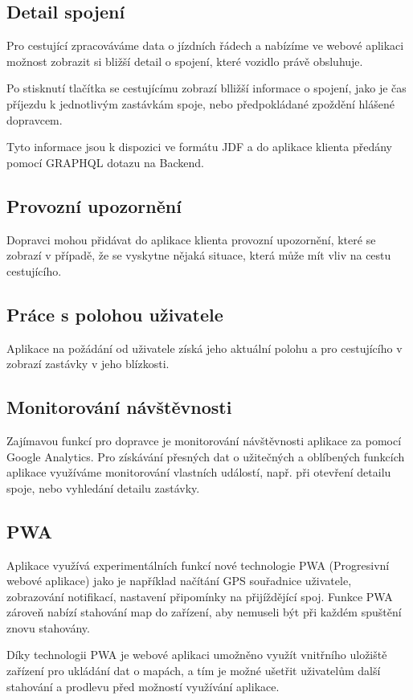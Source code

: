 \subsection{Detail spojení}
Pro cestující zpracováváme data o jízdních řádech a nabízíme ve webové aplikaci možnost zobrazit si bližší detail o spojení, které vozidlo právě obsluhuje.

Po stisknutí tlačítka se cestujícímu zobrazí blližší informace o spojení, jako je čas příjezdu k jednotlivým zastávkám spoje, nebo předpokládané zpoždění hlášené dopravcem.

Tyto informace jsou k dispozici ve formátu JDF a do aplikace klienta předány pomocí GRAPHQL dotazu na Backend.

\subsection{Provozní upozornění}
Dopravci mohou přidávat do aplikace klienta provozní upozornění, které se zobrazí v případě, že se vyskytne nějaká situace, která může mít vliv na cestu cestujícího.
\subsection{Práce s polohou uživatele}
Aplikace na požádání od uživatele získá jeho aktuální polohu a pro cestujícího v zobrazí zastávky v jeho blízkosti.
\subsection{Monitorování návštěvnosti}
Zajímavou funkcí pro dopravce je monitorování návštěvnosti aplikace za pomocí Google Analytics. Pro získávání přesných dat o užitečných a oblíbených funkcích aplikace využíváme monitorování vlastních událostí, např. při otevření detailu spoje, nebo vyhledání detailu zastávky.
\subsection{PWA}
Aplikace využívá experimentálních funkcí nové technologie PWA (Progresivní webové aplikace) jako je například načítání GPS souřadnice uživatele, zobrazování notifikací, nastavení připomínky na přijíždějící spoj.
Funkce PWA zároveň nabízí stahování map do zařízení, aby nemuseli být při každém spuštění znovu stahovány.

Díky technologii PWA je webové aplikaci umožněno využít vnitřního uložiště zařízení pro ukládání dat o mapách, a tím je možné ušetřit uživatelům další stahování a prodlevu před možností využívání aplikace.
